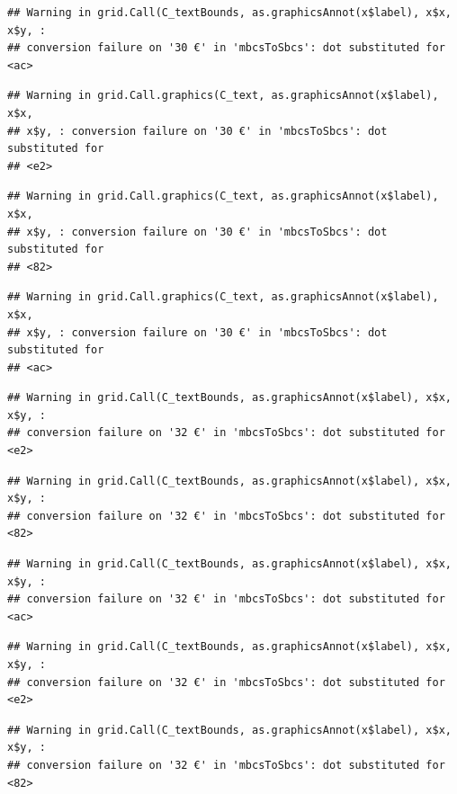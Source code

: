 \documentclass[]{gitbook}
\begin{document}
\begin{verbatim}
## Warning in grid.Call(C_textBounds, as.graphicsAnnot(x$label), x$x, x$y, :
## conversion failure on '30 €' in 'mbcsToSbcs': dot substituted for <ac>
\end{verbatim}

\begin{verbatim}
## Warning in grid.Call.graphics(C_text, as.graphicsAnnot(x$label), x$x,
## x$y, : conversion failure on '30 €' in 'mbcsToSbcs': dot substituted for
## <e2>
\end{verbatim}

\begin{verbatim}
## Warning in grid.Call.graphics(C_text, as.graphicsAnnot(x$label), x$x,
## x$y, : conversion failure on '30 €' in 'mbcsToSbcs': dot substituted for
## <82>
\end{verbatim}

\begin{verbatim}
## Warning in grid.Call.graphics(C_text, as.graphicsAnnot(x$label), x$x,
## x$y, : conversion failure on '30 €' in 'mbcsToSbcs': dot substituted for
## <ac>
\end{verbatim}

\begin{verbatim}
## Warning in grid.Call(C_textBounds, as.graphicsAnnot(x$label), x$x, x$y, :
## conversion failure on '32 €' in 'mbcsToSbcs': dot substituted for <e2>
\end{verbatim}

\begin{verbatim}
## Warning in grid.Call(C_textBounds, as.graphicsAnnot(x$label), x$x, x$y, :
## conversion failure on '32 €' in 'mbcsToSbcs': dot substituted for <82>
\end{verbatim}

\begin{verbatim}
## Warning in grid.Call(C_textBounds, as.graphicsAnnot(x$label), x$x, x$y, :
## conversion failure on '32 €' in 'mbcsToSbcs': dot substituted for <ac>
\end{verbatim}

\begin{verbatim}
## Warning in grid.Call(C_textBounds, as.graphicsAnnot(x$label), x$x, x$y, :
## conversion failure on '32 €' in 'mbcsToSbcs': dot substituted for <e2>
\end{verbatim}

\begin{verbatim}
## Warning in grid.Call(C_textBounds, as.graphicsAnnot(x$label), x$x, x$y, :
## conversion failure on '32 €' in 'mbcsToSbcs': dot substituted for <82>
\end{verbatim}
\end{document}
